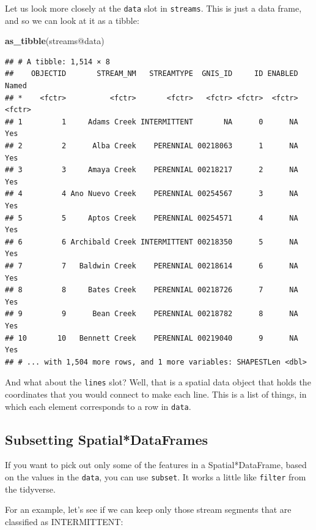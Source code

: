 \documentclass[]{book}
\newenvironment{Shaded}{\begin{snugshade}}{\end{snugshade}}
\newcommand{\KeywordTok}[1]{\textcolor[rgb]{0.13,0.29,0.53}{\textbf{{#1}}}}
\newcommand{\StringTok}[1]{\textcolor[rgb]{0.31,0.60,0.02}{{#1}}}
\newcommand{\NormalTok}[1]{{#1}}
\theoremstyle{definition}
\theoremstyle{definition}
\theoremstyle{remark}
\begin{document}
Let us look more closely at the \texttt{data} slot in \texttt{streams}.
This is just a data frame, and so we can look at it as a tibble:

\begin{Shaded}
\begin{Highlighting}[]
\KeywordTok{as_tibble}\NormalTok{(streams@data)}
\end{Highlighting}
\end{Shaded}

\begin{verbatim}
## # A tibble: 1,514 × 8
##    OBJECTID       STREAM_NM   STREAMTYPE  GNIS_ID     ID ENABLED  Named
## *    <fctr>          <fctr>       <fctr>   <fctr> <fctr>  <fctr> <fctr>
## 1         1     Adams Creek INTERMITTENT       NA      0      NA    Yes
## 2         2      Alba Creek    PERENNIAL 00218063      1      NA    Yes
## 3         3     Amaya Creek    PERENNIAL 00218217      2      NA    Yes
## 4         4 Ano Nuevo Creek    PERENNIAL 00254567      3      NA    Yes
## 5         5     Aptos Creek    PERENNIAL 00254571      4      NA    Yes
## 6         6 Archibald Creek INTERMITTENT 00218350      5      NA    Yes
## 7         7   Baldwin Creek    PERENNIAL 00218614      6      NA    Yes
## 8         8     Bates Creek    PERENNIAL 00218726      7      NA    Yes
## 9         9      Bean Creek    PERENNIAL 00218782      8      NA    Yes
## 10       10   Bennett Creek    PERENNIAL 00219040      9      NA    Yes
## # ... with 1,504 more rows, and 1 more variables: SHAPESTLen <dbl>
\end{verbatim}

And what about the \texttt{lines} slot? Well, that is a spatial data
object that holds the coordinates that you would connect to make each
line. This is a list of things, in which each element corresponds to a
row in \texttt{data}.

\subsection{Subsetting
Spatial*DataFrames}\label{subsetting-spatialdataframes}

If you want to pick out only some of the features in a
Spatial*DataFrame, based on the values in the \texttt{data}, you can use
\texttt{subset}. It works a little like \texttt{filter} from the
tidyverse.

For an example, let's see if we can keep only those stream segments that
are classified as INTERMITTENT:

\begin{Shaded}
\end{Shaded}
\end{document}

